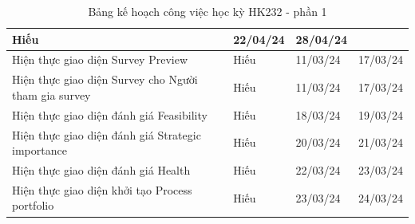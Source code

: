 \begin{table}[H]
{\begin{tabular}{|p{11cm}|p{1.75cm}|p{1.5cm}|p{1.5cm}|}
        { Hiếu} &
        { 22/04/24} &
        { 28/04/24} \\ \hline{ Hiện thực giao diện Survey Preview} &
        { Hiếu} &
        { 11/03/24} &
        { 17/03/24} \\ \hline
        { Hiện thực giao diện Survey cho Người tham gia survey} &
        { Hiếu} &
        { 11/03/24} &
        { 17/03/24} \\ \hline
        { Hiện thực giao diện đánh giá Feasibility} &
        { Hiếu} &
        { 18/03/24} &
        { 19/03/24} \\ \hline
        { Hiện thực giao diện đánh giá Strategic importance} &
        { Hiếu} &
        { 20/03/24} &
        { 21/03/24} \\ \hline
        { Hiện thực giao diện đánh giá Health} &
        { Hiếu} &
        { 22/03/24} &
        { 23/03/24} \\ \hline
        { Hiện thực giao diện khởi tạo Process portfolio} &
        { Hiếu} &
        { 23/03/24} &
        { 24/03/24} \\ \hline
        
    \end{tabular}%
    }
    \caption{Bảng kế hoạch công việc học kỳ HK232 - phần 1}
\end{table}

